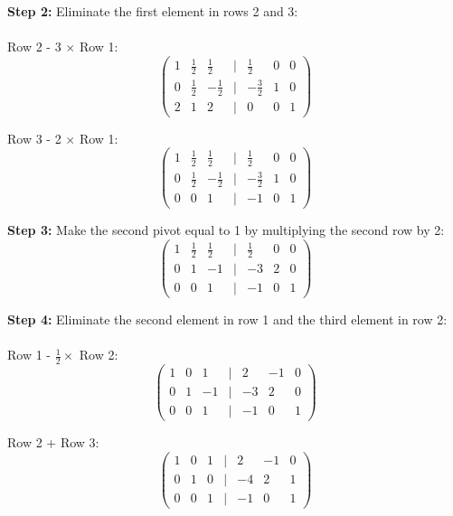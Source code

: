 \textbf{Step 2:} Eliminate the first element in rows 2 and 3:
\\\\
Row 2 - 3 \(\times\) Row 1:
\begin{equation*}
\begin{pmatrix}
1 & \frac{1}{2} & \frac{1}{2} & | & \frac{1}{2} & 0 & 0 \\
0 & \frac{1}{2} & -\frac{1}{2} & | & -\frac{3}{2} & 1 & 0 \\
2 & 1 & 2 & | & 0 & 0 & 1
\end{pmatrix}
\end{equation*}

Row 3 - 2 \(\times\) Row 1:
\begin{equation*}
\begin{pmatrix}
1 & \frac{1}{2} & \frac{1}{2} & | & \frac{1}{2} & 0 & 0 \\
0 & \frac{1}{2} & -\frac{1}{2} & | & -\frac{3}{2} & 1 & 0 \\
0 & 0 & 1 & | & -1 & 0 & 1
\end{pmatrix}
\end{equation*}

\textbf{Step 3:} Make the second pivot equal to 1 by multiplying the second row by 2:
\begin{equation*}
\begin{pmatrix}
1 & \frac{1}{2} & \frac{1}{2} & | & \frac{1}{2} & 0 & 0 \\
0 & 1 & -1 & | & -3 & 2 & 0 \\
0 & 0 & 1 & | & -1 & 0 & 1
\end{pmatrix}
\end{equation*}

\textbf{Step 4:} Eliminate the second element in row 1 and the third element in row 2:
\\\\
Row 1 - \(\frac{1}{2} \times\) Row 2:
\begin{equation*}
\begin{pmatrix}
1 & 0 & 1 & | & 2 & -1 & 0 \\
0 & 1 & -1 & | & -3 & 2 & 0 \\
0 & 0 & 1 & | & -1 & 0 & 1
\end{pmatrix}
\end{equation*}

Row 2 + Row 3:
\begin{equation*}
\begin{pmatrix}
1 & 0 & 1 & | & 2 & -1 & 0 \\
0 & 1 & 0 & | & -4 & 2 & 1 \\
0 & 0 & 1 & | & -1 & 0 & 1
\end{pmatrix}
\end{equation*}

